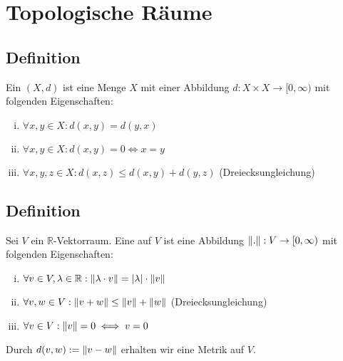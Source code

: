 
\newcommand{\fach}{Grundlagen der Analysis, Topologie, Geometrie}
\newcommand{\shortFach}{Analysis, Topologie, Geometrie}

\newcommand{\prof}{Prof.\,Dr.\,Arthur Bartels}



\maketitle
{}

\tableofcontents
\cleardoubleoddemptypage

\setcounter{page}{1}

\section{Topologische Räume} %
\label{sec:1}

\subsection[Definition: Metrischer Raum]{Definition} %
\label{sub:11}
Ein  $(X,d)$ ist eine Menge $X$ mit einer Abbildung $d: X \times X \to [0,\infty)$ mit folgenden Eigenschaften:
\begin{enumerate}[(i)]
	\item $\forall x,y \in X : d(x,y) = d(y,x) $
	\item $\forall x,y \in X : d(x,y)=0 \iff x=y$
	\item $\forall x,y,z \in X : d(x,z) \le d(x,y) + d(y,z)$ \hfill (Dreiecksungleichung)
\end{enumerate}

\subsection[Definition: Norm auf einem $\mathds{R}$-Vektorraum]{Definition} %
\label{sub:12}
Sei $V$ ein $\mathds{R}$-Vektorraum. Eine  auf $V$ ist eine Abbildung $\norm{.} : V \to [0,\infty)$ mit folgenden Eigenschaften:
\begin{enumerate}[(i)]
	\item $\forall v \in V, \lambda  \in \mathds{R} : \norm{\lambda  \cdot v} = \abs{\lambda}  \cdot \norm{v}  $
	\item $\forall v,w \in V : \norm{v+w} \le \norm{v} + \norm{w} $ \hfill (Dreiecksungleichung)
	\item $\forall v \in V : \norm{v} = 0 \iff v=0$
\end{enumerate} 
Durch $d(v,w) := \norm{v-w} $ erhalten wir eine Metrik auf $V$.

